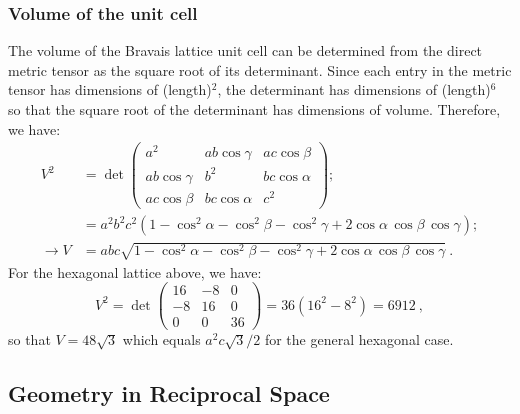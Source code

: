 \subsubsection{Volume of the unit cell}
The volume of the Bravais lattice unit cell can be determined from the direct metric tensor as the square root of its determinant.  Since each entry in the metric tensor has dimensions of (length)$^2$, the determinant has dimensions of (length)$^6$ so that the square root of the determinant has dimensions of volume.  Therefore, we have:
\begin{equation*}
\begin{split}
	V^2 &= \det \begin{pmatrix}a^2 & a b \cos\gamma & a c \cos\beta\\
	 a b \cos\gamma & b^2 & b c \cos\alpha\\
	 a c \cos\beta & b c \cos\alpha & c^2\end{pmatrix};\\
	 &=a^2b^2c^2\left(1-\cos^2\alpha-\cos^2\beta-\cos^2\gamma+2\cos\alpha\,\cos\beta\,\cos\gamma\right);\\
	 \rightarrow V &= abc\sqrt{1-\cos^2\alpha-\cos^2\beta-\cos^2\gamma+2\cos\alpha\,\cos\beta\,\cos\gamma}\ .
\end{split}
\end{equation*}
For the hexagonal lattice above, we have:
\[
	V^2 = \det \begin{pmatrix}16 & -8& 0 \\ -8 & 16 & 0\\  0 & 0 & 36\end{pmatrix} = 36(16^2 - 8^2)= 6912\ ,
\]
so that $V=48\sqrt{3}$ which equals $a^2c\sqrt{3}/2$ for the general hexagonal case.  

%
%

\subsection{Geometry in Reciprocal Space}\label{\chabbr:sec:RS}

